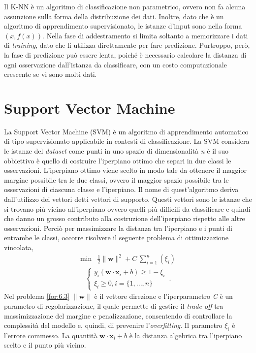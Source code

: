 Il K-NN è un algoritmo di classificazione non parametrico, ovvero non fa alcuna assunzione sulla forma della distribuzione dei dati. Inoltre, dato che è un algoritmo di apprendimento supervisionato, le istanze d'input sono nella forma $(x, f(x))$. Nella fase di 
addestramento si limita soltanto a memorizzare i dati di \emph{training}, dato che li utilizza direttamente per fare predizione. Purtroppo, però, la fase di predizione può essere lenta, poiché è necessario calcolare la distanza di ogni osservazione dall'istanza da classificare, con un costo computazionale crescente se vi sono molti dati.

\section{Support Vector Machine}
La Support Vector Machine (SVM) \autocite{GHOLAMI2017515} è un algoritmo di apprendimento automatico di tipo supervisionato applicabile in contesti di classificazione. La SVM considera le istanze del \emph{dataset} come punti in uno spazio di dimensionalità \emph{n} è il suo obbiettivo è quello di costruire l'iperpiano ottimo che separi in due classi le osservazioni. L'iperpiano ottimo viene scelto in modo tale da ottenere il maggior margine possibile tra le due classi, ovvero il maggior spazio possibile tra le osservazioni di ciascuna classe e l'iperpiano. Il nome di quest'algoritmo deriva dall'utilizzo dei vettori detti vettori di supporto. Questi vettori sono le istanze che si trovano più vicino all'iperpiano ovvero quelli più difficili da classificare e quindi che danno un grosso contributo alla costruzione dell'iperpiano rispetto alle altre osservazioni. Perciò per massimizzare la distanza tra l'iperpiano e i punti di entrambe le classi, occorre risolvere il seguente problema di ottimizzazione vincolata, 
\begin{align}
	\text{min} & \frac{1}{2} \|\mathbf{w}\|^2 + C \, \sum_{i=1}^{n} (\xi_i) \label{for:6.3}
\end{align}
\begin{align*} 
	\begin{cases}
		y_i(\mathbf{w \cdot x}_i + b) \geq  1 - \xi_i \\
		\xi_i \geq 0, i=\{1,...,n\}
	\end{cases} \, .
\end{align*}
Nel problema \ref{for:6.3} $\|\mathbf{w}\|$ è il vettore direzione e l'iperparametro \emph{C} è un parametro di regolarizzazione, il quale permette di gestire il \emph{trade-off} tra massimizzazione del margine e penalizzazione, consentendo di controllare la complessità del modello e, quindi, di prevenire l'\emph{overfitting}. Il parametro $\xi_i$ è l'errore commesso. La quantità $\mathbf{w \cdot x}_i + b$ è la distanza algebrica tra l'iperpiano scelto e il punto più vicino.\\

